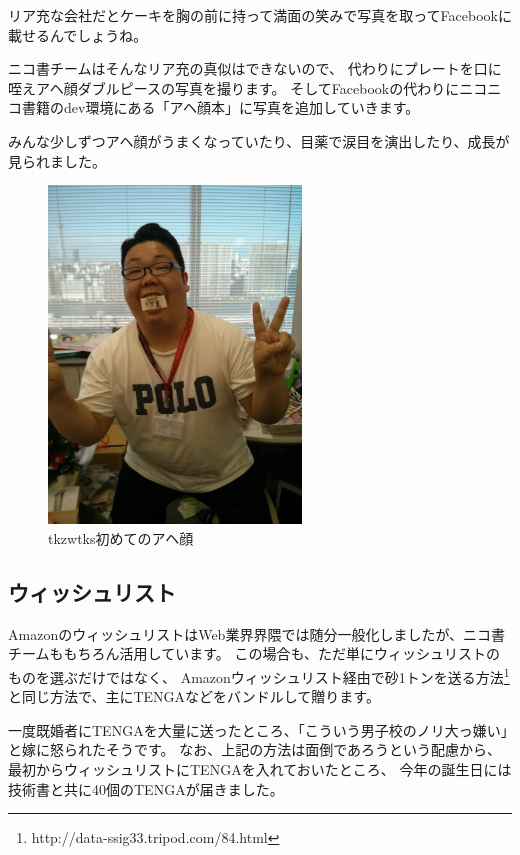 リア充な会社だとケーキを胸の前に持って満面の笑みで写真を取ってFacebookに載せるんでしょうね。

ニコ書チームはそんなリア充の真似はできないので、
代わりにプレートを口に咥えアヘ顔ダブルピースの写真を撮ります。
そしてFacebookの代わりにニコニコ書籍のdev環境にある「アヘ顔本」に写真を追加していきます。

みんな少しずつアヘ顔がうまくなっていたり、目薬で涙目を演出したり、成長が見られました。

\begin{figure}[H]
\centering
\includegraphics[width=0.6\textwidth]{../images/ahegao_takizawa.jpg}
\caption{tkzwtks初めてのアヘ顔}
\end{figure}

\subsection{ウィッシュリスト}

AmazonのウィッシュリストはWeb業界界隈では随分一般化しましたが、ニコ書チームももちろん活用しています。
この場合も、ただ単にウィッシュリストのものを選ぶだけではなく、
Amazonウィッシュリスト経由で砂1トンを送る方法\footnote{http://data-ssig33.tripod.com/84.html}
 と同じ方法で、主にTENGAなどをバンドルして贈ります。

一度既婚者にTENGAを大量に送ったところ、「こういう男子校のノリ大っ嫌い」と嫁に怒られたそうです。
なお、上記の方法は面倒であろうという配慮から、
最初からウィッシュリストにTENGAを入れておいたところ、
今年の誕生日には技術書と共に40個のTENGAが届きました。


